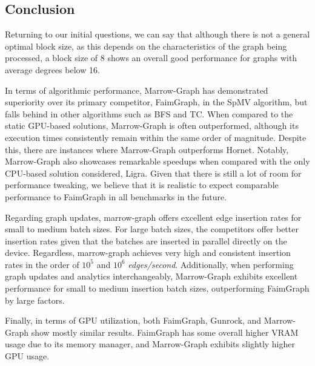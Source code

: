 \subsection{Conclusion}

Returning to our initial questions, we can say that although there is not a general optimal block size, as this depends on the characteristics of the graph being processed, a block size of 8 shows an overall good performance for graphs with average degrees below 16. 



In terms of algorithmic performance, Marrow-Graph has demonstrated superiority over its primary competitor, FaimGraph, in the \gls{SpMV} algorithm, but falls behind in other algorithms such as \gls{BFS} and \gls{TC}. When compared to the static \gls{GPU}-based solutions, Marrow-Graph is often outperformed, although its execution times consistently remain within the same order of magnitude. Despite this, there are instances where Marrow-Graph outperforms Hornet. Notably, Marrow-Graph also showcases remarkable speedups when compared with the only \gls{CPU}-based solution considered, Ligra.
%
Given that there is still a lot of room for performance tweaking, we believe that it is realistic to expect comparable performance to FaimGraph in all benchmarks in the future. 

Regarding graph updates, marrow-graph offers excellent edge insertion rates for small to medium batch sizes. For large batch sizes, the competitors offer better insertion rates given that the batches are inserted in parallel directly on the device. Regardless, marrow-graph achieves very high and consistent insertion rates in the order of $10^5$ and $10^6$ \textit{edges/second}. Additionally, when performing graph updates and analytics interchangeably, Marrow-Graph exhibits excellent performance for small to medium insertion batch sizes, outperforming FaimGraph by large factors.

Finally, in terms of \gls{GPU} utilization, both FaimGraph, Gunrock, and Marrow-Graph show mostly similar results. FaimGraph has some overall higher \gls{VRAM} usage due to its memory manager, and Marrow-Graph exhibits slightly higher \gls{GPU} usage.